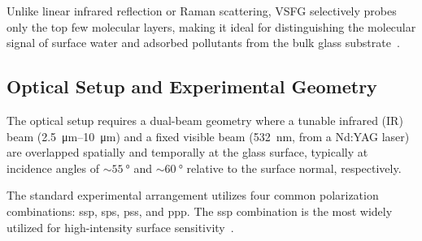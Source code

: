 Unlike linear infrared reflection or Raman scattering, VSFG selectively probes
only the top few molecular layers, making it ideal for distinguishing the
molecular signal of surface water and adsorbed pollutants from the bulk glass
substrate~\cite{jubb2012environmental,shen2016fundamentals}.

\subsection{Optical Setup and Experimental Geometry}

The optical setup requires a dual-beam geometry where a tunable infrared (IR)
beam (\qtyrange{2.5}{10}{\um}) and a fixed visible beam (\qty{532}{\nm}, from a
Nd:YAG laser) are overlapped spatially and temporally at the glass surface,
typically at incidence angles of $\sim \qty{55}{\degree}$ and
$\sim \qty{60}{\degree}$ relative to the surface normal, respectively.

The standard experimental arrangement utilizes four common polarization
combinations: ssp, sps, pss, and ppp. The ssp combination is the most widely
utilized for high-intensity surface sensitivity~\cite{jubb2012environmental}.

